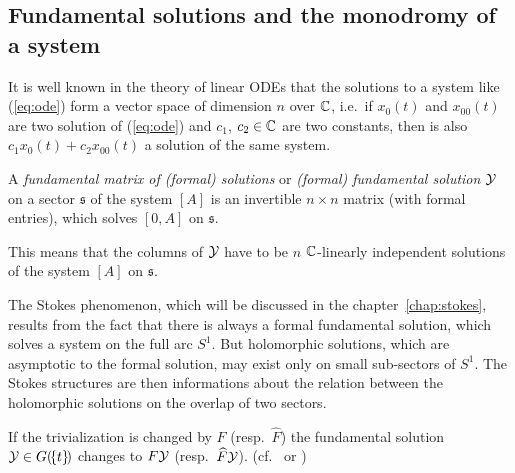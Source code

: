 \subsection{Fundamental solutions and the monodromy of a system}
It is well known in the theory of linear ODEs that the solutions to a system
like (\ref{eq:ode}) form a vector space of dimension $n$ over $\mathbb{C}$, i.e.\ if
$x_0(t)$ and $x_{00}(t)$ are two solution of (\ref{eq:ode}) and $c_1$,
$c_2\in\mathbb{C}$ are two constants, then is also $c_1x_0(t)+c_2x_{00}(t)$ a solution
of the same system.
\begin{defn}
  A \emph{fundamental matrix of (formal) solutions} or \emph{(formal)
  fundamental solution} $\mathcal{Y}$ on a sector $\mathfrak{s}$ of the
  system $[A]$ is an invertible $n\times n$ matrix (with formal entries), which
  solves $[0,A]$ on $\mathfrak{s}$.

  This means that the columns of $\mathcal{Y}$ have to be $n$ $\mathbb{C}$-linearly independent
  solutions of the system $[A]$ on $\mathfrak{s}$.
  \begin{comment}
    \begin{s-rem}
      \begin{itemize}
      \item Some authors\PROBLEM[?] introduce multi-valued solutions, to avoid
        the restriction to sectors.
        \begin{einr}
          \emph{Multi-valued} are functions, which are not single-valued and
          \emph{single-valued} is a function $f$, which satisfies
          \[
            f(t)=f(t\exp(2\pi i)) \qquad\text{whenever both sides are defined.}
          \]
        \end{einr}
        The function $t\to t^\alpha$, for example, is single-valued whenever
        $\alpha\in\Z$.
      \end{itemize}
    \end{s-rem}
  \end{comment}
\end{defn}
The Stokes phenomenon, which will be discussed in the
chapter~\ref{chap:stokes}, results from the fact that there is always a formal
fundamental solution, which solves a system on the full arc $S^1$.
But holomorphic solutions, which are asymptotic to the formal solution, may
exist only on small sub-sectors of $S^1$. The Stokes structures are then
informations about the relation between the holomorphic solutions on the overlap
of two sectors.
\begin{rem}
  If the trivialization is changed by $F$ (resp.\ $\hat F$) the fundamental
  solution $\mathcal{Y}\in G(\!\{t\}\!)$ changes to $F\mathcal{Y}$ (resp.\ $\widehat F\mathcal{Y}$).
  (cf.\ \cite[Thm.4.3.1]{Loday2014} or \cite[2.1.3]{Zein2009})
\end{rem}

